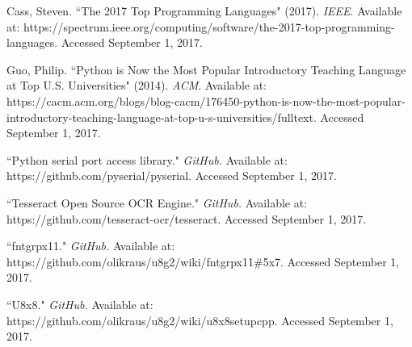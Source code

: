 \documentclass[12pt]{article}
\begin{document}
\begin{thebibliography}{}
Cass, Steven.  ``The 2017 Top Programming Languages" (2017).  \textit{IEEE}.  Available at: 
https://spectrum.ieee.org/computing/software/the-2017-top-programming-languages.  Accessed September 1, 2017.

Guo, Philip.  ``Python is Now the Most Popular Introductory Teaching Language at Top U.S. Universities" (2014).  \textit{ACM}.  Available at:
https://cacm.acm.org/blogs/blog-cacm/176450-python-is-now-the-most-popular-introductory-teaching-language-at-top-u-s-universities/fulltext.  Accessed September 1, 2017.

``Python serial port access library." \textit{GitHub.}  Available at:
https://github.com/pyserial/pyserial.  Accessed September 1, 2017.

``Tesseract Open Source OCR Engine." \textit{GitHub.} Available at:
https://github.com/tesseract-ocr/tesseract.  Accessed September 1, 2017.

``fntgrpx11." \textit{GitHub.}  Available at:
https://github.com/olikraus/u8g2/wiki/fntgrpx11\#5x7.  Accessed September 1, 2017.


``U8x8." \textit{GitHub.}  Available at:
https://github.com/olikraus/u8g2/wiki/u8x8setupcpp.  Accessed September 1, 2017.

\end{thebibliography}
\end{document}
